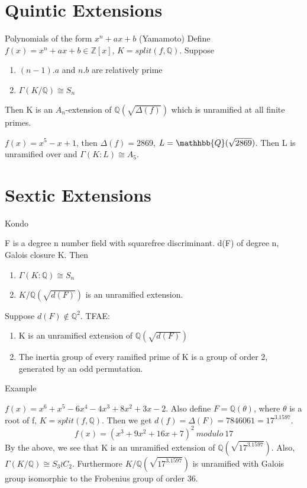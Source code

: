 \documentclass[10pt]{beamer}
\theoremstyle{plain} %
\begin{document}
\section{Quintic Extensions}
\begin{frame}{Polynomials of the form $x^n+ax+b$ (Yamamoto)}
Define $ f(x) = x^n+ax+b \in \mathbb{Z}[x]$,
$K=split(f,\mathbb{Q})$. 
Suppose
\begin{enumerate}
    \item $(n-1).a$ and $n.b$ are relatively prime 
    \item $\Gamma(K/\mathbb{Q}) \cong S_n$
\end{enumerate}\par
Then K is an $A_n$-extension of $\mathbb{Q}(\sqrt{\Delta(f)})$ which is unramified at all finite primes. \begin{example}
$f(x) = x^5-x+1$, then $\Delta(f)= 2869$, $L = \mathhbb{Q}(\sqrt{2869})$. Then L is unramified over  and $\Gamma(K:L)\cong A_5.$
\end{example}  
\end{frame}
\section{Sextic Extensions}
\begin{frame}{Kondo}
    \begin{theorem}
   F is a degree n number field with squarefree discriminant.  d(F) of degree n, Galois closure K. Then \begin{enumerate}
        \item $\Gamma(K:\mathbb{Q})\cong S_n$
        \item $K/\mathbb{Q}(\sqrt{d(F)})$ is an unramified extension.
    \end{enumerate}
\end{theorem}
\begin{lemma}
Suppose $d(F)\notin \mathbb{Q}^2$. TFAE:
\begin{enumerate}
    \item K is an unramified extension of $\mathbb{Q}(\sqrt{d(F)})$
    \item The inertia group of every ramified prime of K is a group of order 2, generated by an odd permutation. 
\end{enumerate}
\end{lemma} 
\end{frame}
\begin{frame}{Example}
\begin{example}
 $f(x)=x^6 + x^5 - 6x^4 - 4x^3 + 8x^2 + 3x - 2$. Also define $F=\mathbb{Q}(\theta)$, where $\theta$ is a root of f, $K=split(f,\mathbb{Q})$. Then we get $d(f)=\Delta(F)=7846061=17^3.1597$. 
\begin{equation}
   f(x)= (x^3 + 9x^2 + 16x + 7)^2\:modulo\:17
\end{equation}
By the above, we see that K is an unramified extension of $\mathbb{Q}(\sqrt{17^3.1597})$. Also, $\Gamma(K/\mathbb{Q})\cong S_3 \wr C_2$. Furthermore $K/\mathbb{Q}(\sqrt{17^3.1597})$ is unramified with Galois group isomorphic to the Frobenius group of order 36.
\end{example}    
\end{frame}
\end{document}
